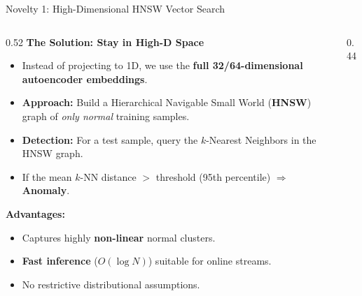 \documentclass[aspectratio=169]{beamer}
\begin{document}
\begin{frame}{Novelty 1: High-Dimensional HNSW Vector Search}
    \begin{columns}[T]
        \begin{column}{0.52\textwidth}
            \textbf{The Solution: Stay in High-D Space}
            \begin{itemize}
                \item Instead of projecting to 1D, we use the \textbf{full 32/64-dimensional autoencoder embeddings}.
                \item \textbf{Approach:} Build a Hierarchical Navigable Small World (\textbf{HNSW}) graph of \textit{only normal} training samples.
                \item \textbf{Detection:} For a test sample, query the $k$-Nearest Neighbors in the HNSW graph.
                \item If the mean $k$-NN distance $>$ threshold (95th percentile) $\Rightarrow$ \textbf{Anomaly}.
            \end{itemize}

            \vspace{0.3cm}
            \textbf{Advantages:}
            \begin{itemize}
                \item Captures highly \textbf{non-linear} normal clusters.
                \item \textbf{Fast inference} ($O(\log N)$) suitable for online streams.
                \item No restrictive distributional assumptions.
            \end{itemize}
        \end{column}
        \begin{column}{0.44\textwidth}
            \centering
\end{column}
\end{columns}
\end{frame}
\end{document}
